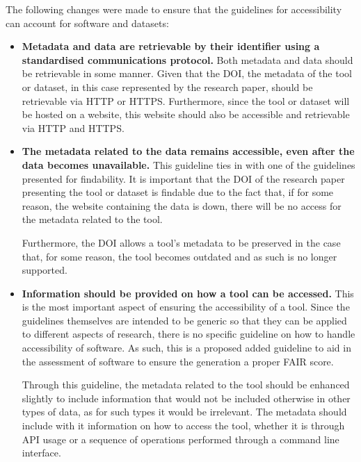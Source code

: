 \documentclass{cisfyp}
\begin{document}
The following changes were made to ensure that the guidelines for accessibility can account for software and datasets: \cite{dbcls}
\begin{itemize}
	\item \textbf{Metadata and data are retrievable by their identifier using a standardised communications protocol.}\newline
	Both metadata and data should be retrievable in some manner. Given that the DOI, the metadata of the tool or dataset, in this case represented by the research paper, should be retrievable via HTTP or HTTPS. Furthermore, since the tool or dataset will be hosted on a website, this website should also be accessible and retrievable via HTTP and HTTPS.
	
	\item \textbf{The metadata related to the data remains accessible, even after the data becomes unavailable.}\newline
	This guideline ties in with one of the guidelines presented for findability. It is important that the DOI of the research paper presenting the tool or dataset is findable due to the fact that, if for some reason, the website containing the data is down, there will be no access for the metadata related to the tool.
	
	Furthermore, the DOI allows a tool's metadata to be preserved in the case that, for some reason, the tool becomes outdated and as such is no longer supported. 
	
	\item \textbf{Information should be provided on how a tool can be accessed.}\newline
	This is the most important aspect of ensuring the accessibility of a tool. Since the guidelines themselves are intended to be generic so that they can be applied to different aspects of research, there is no specific guideline on how to handle accessibility of software. As such, this is a proposed added guideline to aid in the assessment of software to ensure the generation a proper FAIR score. 
	
	Through this guideline, the metadata related to the tool should be enhanced slightly to include information that would not be included otherwise in other types of data, as for such types it would be irrelevant. The metadata should include with it information on how to access the tool, whether it is through API usage or a sequence of operations performed through a command line interface. 
	
\end{itemize}\pagebreak
\end{document}
